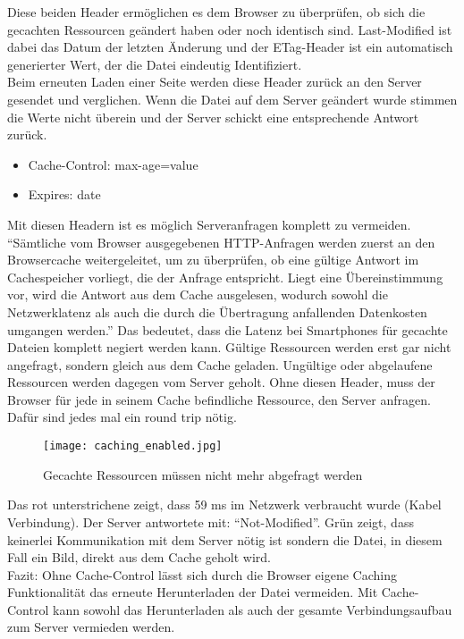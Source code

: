 		  Diese beiden Header ermöglichen es dem Browser zu überprüfen, ob sich die gecachten Ressourcen geändert haben oder noch identisch sind. Last-Modified ist dabei das Datum der letzten Änderung und der ETag-Header ist ein automatisch generierter Wert, der die Datei eindeutig Identifiziert.\\
		  Beim erneuten Laden einer Seite werden diese Header zurück an den Server gesendet und verglichen. Wenn die Datei auf dem Server geändert wurde stimmen die Werte nicht überein und der Server schickt eine entsprechende Antwort zurück.

		  \begin{itemize}
		  	\item Cache-Control: max-age=value
		  	\item Expires: date
		  \end{itemize}

		  Mit diesen Headern ist es möglich Serveranfragen komplett zu vermeiden. "`Sämtliche vom Browser ausgegebenen HTTP-Anfragen werden zuerst an den Browsercache weitergeleitet, um zu überprüfen, ob eine gültige Antwort im Cachespeicher vorliegt, die der Anfrage entspricht. Liegt eine Übereinstimmung vor, wird die Antwort aus dem Cache ausgelesen, wodurch sowohl die Netzwerklatenz als auch die durch die Übertragung anfallenden Datenkosten umgangen werden."'\autocite{grigorikCaching} Das bedeutet, dass die Latenz bei Smartphones für gecachte Dateien komplett negiert werden kann. Gültige Ressourcen werden erst gar nicht angefragt, sondern gleich aus dem Cache geladen. Ungültige oder abgelaufene Ressourcen werden dagegen vom Server geholt. Ohne diesen Header, muss der Browser für jede in seinem Cache befindliche Ressource, den Server anfragen. Dafür sind jedes mal ein round trip nötig.\\

		  \begin{figure}[htbp]
		  	\begin{center}
		  		\texttt{[image: caching\_enabled.jpg]}
		  		\caption{Gecachte Ressourcen müssen nicht mehr abgefragt werden}
		  		\label{fig:caching_enabled}
		  	\end{center}
		  \end{figure}
		  
		  Das rot unterstrichene zeigt, dass 59 ms im Netzwerk verbraucht wurde (Kabel Verbindung). Der Server antwortete mit: "`Not-Modified"'. Grün zeigt, dass keinerlei Kommunikation mit dem Server nötig ist sondern die Datei, in diesem Fall ein Bild, direkt aus dem Cache geholt wird.\\
		  Fazit: Ohne Cache-Control lässt sich durch die Browser eigene Caching Funktionalität das erneute Herunterladen der Datei vermeiden. Mit Cache-Control kann sowohl das Herunterladen als auch der gesamte Verbindungsaufbau zum Server vermieden werden.\\
		 

